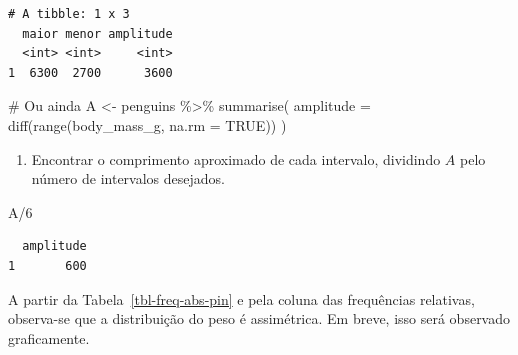 \documentclass[
  12pt,
  letterpaper,
  DIV=11,
  numbers=noendperiod]{scrreprt}
\newenvironment{Shaded}{\begin{snugshade}}{\end{snugshade}}
\newcommand{\AttributeTok}[1]{\textcolor[rgb]{0.40,0.45,0.13}{#1}}
\newcommand{\CommentTok}[1]{\textcolor[rgb]{0.37,0.37,0.37}{#1}}
\newcommand{\ConstantTok}[1]{\textcolor[rgb]{0.56,0.35,0.01}{#1}}
\newcommand{\DecValTok}[1]{\textcolor[rgb]{0.68,0.00,0.00}{#1}}
\newcommand{\FunctionTok}[1]{\textcolor[rgb]{0.28,0.35,0.67}{#1}}
\newcommand{\NormalTok}[1]{\textcolor[rgb]{0.00,0.23,0.31}{#1}}
\newcommand{\OtherTok}[1]{\textcolor[rgb]{0.00,0.23,0.31}{#1}}
\newcommand{\SpecialCharTok}[1]{\textcolor[rgb]{0.37,0.37,0.37}{#1}}
\providecommand{\tightlist}{%
  \setlength{\itemsep}{0pt}\setlength{\parskip}{0pt}}\usepackage{longtable,booktabs,array}
\theoremstyle{definition}
\theoremstyle{exemplo}
\begin{document}
\begin{verbatim}
# A tibble: 1 x 3
  maior menor amplitude
  <int> <int>     <int>
1  6300  2700      3600
\end{verbatim}

\begin{Shaded}
\begin{Highlighting}[]
\CommentTok{\# Ou ainda}
\NormalTok{A }\OtherTok{\textless{}{-}}\NormalTok{ penguins }\SpecialCharTok{\%\textgreater{}\%} 
  \FunctionTok{summarise}\NormalTok{(}
    \AttributeTok{amplitude =} \FunctionTok{diff}\NormalTok{(}\FunctionTok{range}\NormalTok{(body\_mass\_g, }\AttributeTok{na.rm =} \ConstantTok{TRUE}\NormalTok{))}
\NormalTok{  )}
\end{Highlighting}
\end{Shaded}

\begin{enumerate}
\def\labelenumi{\arabic{enumi}.}
\setcounter{enumi}{1}
\tightlist
\item
  Encontrar o comprimento aproximado de cada intervalo, dividindo \(A\)
  pelo número de intervalos desejados.
\end{enumerate}

\begin{Shaded}
\begin{Highlighting}[]
\NormalTok{A}\SpecialCharTok{/}\DecValTok{6}
\end{Highlighting}
\end{Shaded}

\begin{verbatim}
  amplitude
1       600
\end{verbatim}

A partir da Tabela~\ref{tbl-freq-abs-pin} e pela coluna das frequências
relativas, observa-se que a distribuição do peso é assimétrica. Em
breve, isso será observado graficamente.
\end{document}
